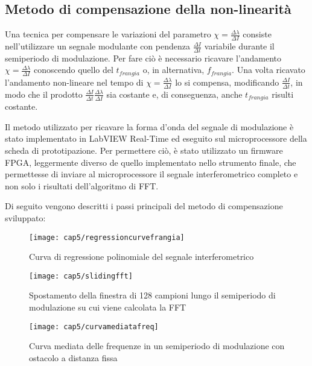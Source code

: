 \subsection{Metodo di compensazione della non-linearità}
\label{subsec:metodocomp}
Una tecnica per compensare le variazioni del parametro $\chi = \frac{\Delta \lambda}{\Delta I}$ consiste nell'utilizzare un segnale modulante con pendenza $\frac{\Delta I}{\Delta t}$ variabile durante il semiperiodo di modulazione. Per fare ciò è necessario ricavare l'andamento $\chi = \frac{\Delta \lambda}{\Delta I}$ conoscendo quello del $t_{frangia}$ o, in alternativa, $f_{frangia}$. Una volta ricavato l'andamento non-lineare nel tempo di $\chi = \frac{\Delta \lambda}{\Delta I}$ lo si compensa, modificando $\frac{\Delta I}{\Delta t}$, in modo che il prodotto $\frac{\Delta I}{\Delta t} \frac{\Delta \lambda}{\Delta I}$ sia costante e, di conseguenza, anche $t_{frangia}$ risulti costante.

Il metodo utilizzato per ricavare la forma d'onda del segnale di modulazione è stato implementato in LabVIEW Real-Time ed eseguito sul microprocessore della scheda di prototipazione. Per permettere ciò, è stato utilizzato un firmware FPGA, leggermente diverso de quello implementato nello strumento finale, che permettesse di inviare al microprocessore il segnale interferometrico completo e non solo i risultati dell'algoritmo di FFT.

Di seguito vengono descritti i passi principali del metodo di compensazione sviluppato:
\begin{figure}  
  \begin{center}
    \texttt{[image: cap5/regressioncurvefrangia]}
    \caption{Curva di regressione polinomiale del segnale interferometrico}
    \label{regressioncurvefrangia}
  \end{center}
\end{figure}

\begin{figure}  
  \begin{center}
    \texttt{[image: cap5/slidingfft]}
    \caption{Spostamento della finestra di 128 campioni lungo il semiperiodo di modulazione su cui viene calcolata la FFT}
    \label{slidingfft}
  \end{center}
\end{figure}

\begin{figure}  
  \begin{center}
    \texttt{[image: cap5/curvamediatafreq]}
    \caption{Curva mediata delle frequenze in un semiperiodo di modulazione con ostacolo a distanza fissa}
    \label{curvamediatafreq}
  \end{center}
\end{figure}

